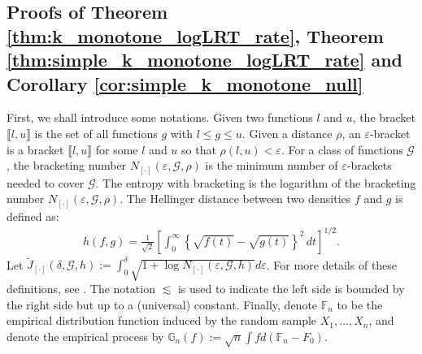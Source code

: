 \documentclass[12pt,letterpaper, twoside, openany]{article}
\theoremstyle{plain}
\begin{document}
\subsection{Proofs of Theorem \ref{thm:k_monotone_logLRT_rate},
Theorem \ref{thm:simple_k_monotone_logLRT_rate} and Corollary \ref{cor:simple_k_monotone_null}}

First, we shall introduce some notations. Given two functions $l$ and $u$, the bracket $\llbracket l, u \rrbracket$ is the set of all functions $g$ with $l \leq g \leq u$. Given a distance $\rho$, an $\varepsilon$-bracket is a bracket $\llbracket l, u \rrbracket$ for some $l$ and $u$ so that  $\rho(l, u) < \varepsilon$. For a class of functions $\mathcal{G}$, the bracketing number $N_{[\cdot]}(\varepsilon, \mathcal{G}, \rho)$ is the minimum number of $\varepsilon$-brackets needed to cover $\mathcal{G}$. The entropy with bracketing is the logarithm of the bracketing number $N_{[\cdot]}(\varepsilon, \mathcal{G}, \rho)$. The Hellinger distance between two densities $f$ and $g$ is defined as:
	\begin{align*}
		h(f,g) = \frac{1}{\sqrt{2}}\left[ \int_0^\infty \left\{ \sqrt{f(t)} - \sqrt{g(t)}\right\}^2\,dt\right]^{1/2}. 
	\end{align*} 
	Let $\tilde{J}_{[\cdot]}(\delta, \mathcal{G}, h) := \int^\delta_0 \sqrt{1 + \log N_{[\cdot]}(\varepsilon, \mathcal{G}, h)} d\varepsilon$. For more details of these definitions, see \cite{van1996weak}. 
	The notation $\lesssim$ is used to indicate the left side is bounded by the right side but up to a (universal) constant. 
	Finally, denote $\mathbb{F}_n$ to be the empirical distribution function induced by the random sample $X_1,\ldots,X_n$, and denote the empirical process by $\mathbb{G}_n(f) := \sqrt{n} \int f d (\mathbb{F}_n - F_0)$.
\end{document}
